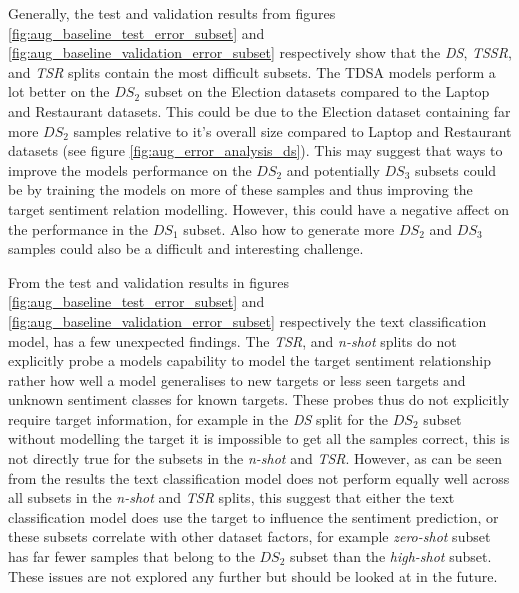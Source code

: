Generally, the test and validation results from figures \ref{fig:aug_baseline_test_error_subset} and \ref{fig:aug_baseline_validation_error_subset} respectively show that the \textit{DS}, \textit{TSSR}, and \textit{TSR} splits contain the most difficult subsets. The TDSA models perform a lot better on the $DS_2$ subset on the Election datasets compared to the Laptop and Restaurant datasets. This could be due to the Election dataset containing far more $DS_2$ samples relative to it's overall size compared to Laptop and Restaurant datasets (see figure \ref{fig:aug_error_analysis_ds}). This may suggest that ways to improve the models performance on the $DS_2$ and potentially $DS_3$ subsets could be by training the models on more of these samples and thus improving the target sentiment relation modelling. However, this could have a negative affect on the performance in the $DS_1$ subset. Also how to generate more $DS_2$ and $DS_3$ samples could also be a difficult and interesting challenge.

From the test and validation results in figures \ref{fig:aug_baseline_test_error_subset} and \ref{fig:aug_baseline_validation_error_subset} respectively the text classification model, has a few unexpected findings. The \textit{TSR}, and \textit{n-shot} splits do not explicitly probe a models capability to model the target sentiment relationship rather how well a model generalises to new targets or less seen targets and unknown sentiment classes for known targets. These probes thus do not explicitly require target information, for example in the \textit{DS} split for the $DS_2$ subset without modelling the target it is impossible to get all the samples correct, this is not directly true for the subsets in the \textit{n-shot} and \textit{TSR}. However, as can be seen from the results the text classification model does not perform equally well across all subsets in the \textit{n-shot} and \textit{TSR} splits, this suggest that either the text classification model does use the target to influence the sentiment prediction, or these subsets correlate with other dataset factors, for example \textit{zero-shot} subset has far fewer samples that belong to the $DS_2$ subset than the \textit{high-shot} subset. These issues are not explored any further but should be looked at in the future.

